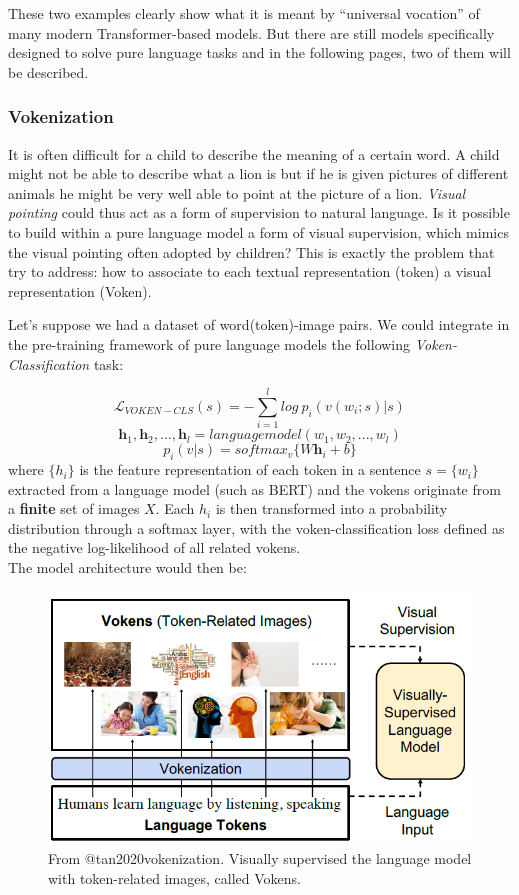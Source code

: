 \documentclass[
]{krantz}
\begin{document}
These two examples clearly show what it is meant by ``universal vocation'' of many modern Transformer-based models. But there are still models specifically designed to solve pure language tasks and in the following pages, two of them will be described.

\hypertarget{vokenization}{%
\subsubsection{Vokenization}\label{vokenization}}

It is often difficult for a child to describe the meaning of a certain word. A child might not be able to describe what a lion is but if he is given pictures of different animals he might be very well able to point at the picture of a lion. \emph{Visual pointing} could thus act as a form of supervision to natural language. Is it possible to build within a pure language model a form of visual supervision, which mimics the visual pointing often adopted by children? This is exactly the problem that \citet{tan2020vokenization} try to address: how to associate to each textual representation (token) a visual representation (Voken).

Let's suppose we had a dataset of word(token)-image pairs. We could integrate in the pre-training framework of pure language models the following \emph{Voken-Classification} task:

\[\mathcal{L}_{VOKEN-CLS}(s)=-\sum_{i=1}^{l}log\ p_{i}(v(w_{i};s)|s) \]
\[\textbf{h}_{1}, \textbf{h}_{2},...,\textbf{h}_{l}=languagemodel(w_{1},w_{2},...,w_{l}) \]
\[p_{i}(v|s)=softmax_{v}\{W\textbf{h}_{i}+b\}\]
where \(\{h_i\}\) is the feature representation of each token in a sentence \(s=\{w_i\}\) extracted from a language model (such as BERT) and the vokens originate from a \textbf{finite} set of images \(X\). Each \(h_i\) is then transformed into a probability distribution through a softmax layer, with the voken-classification loss defined as the negative log-likelihood of all related vokens.\\
The model architecture would then be:

\begin{figure}

{\centering \includegraphics[width=0.7\linewidth]{figures/02-03-img-support-text/img-tan2020-04} 

}

\caption{From @tan2020vokenization. Visually supervised the language model with token-related images, called Vokens.}\label{fig:img-tan2020-04}
\end{figure}
\end{document}
